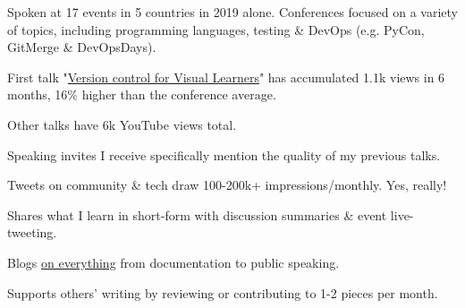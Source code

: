 \documentclass[letterpaper]{deedy-resume} %
\begin{document}
\begin{minipage}[t]{0.66\textwidth}

\vspace{\topsep} %
\begin{tightitemize}
\item Spoken at 17 events in 5 countries in 2019 alone. Conferences focused on a variety of topics, including programming languages, testing \& DevOps (e.g. PyCon, GitMerge \& DevOpsDays).
\item First talk "\href{https://youtu.be/lj0F2Usb9ao?list=PL5Xenu2lf44ab_6BqqBlN4Ux5fdoJMeEx}{Version control for Visual Learners}" has accumulated 1.1k views in 6 months, 16\% higher than the conference average.
\item Other talks have 6k YouTube views total.
\item Speaking invites I receive specifically mention the quality of my previous talks.
\end{tightitemize}

\sectionspace %


\begin{tightitemize}
\item Tweets on community \& tech draw 100-200k+ impressions/monthly. Yes, really!
\item Shares what I learn in short-form with discussion summaries \& event live-tweeting.
\end{tightitemize}

\sectionspace %


\begin{tightitemize}
\item Blogs \href{http://veronicahanus.com/blog.html}{on everything} from documentation to public speaking.
\item Supports others' writing by reviewing or contributing to 1-2 pieces per month.
\end{tightitemize}


\end{minipage}
\end{document}
